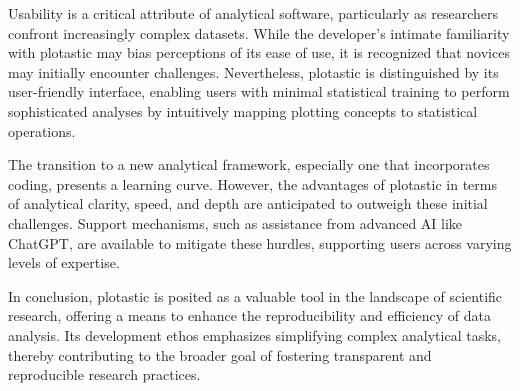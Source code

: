 Usability is a critical attribute of analytical software, particularly as
researchers confront increasingly complex datasets. While the developer's
intimate familiarity with plotastic may bias perceptions of its ease of use, it
is recognized that novices may initially encounter challenges. Nevertheless,
plotastic is distinguished by its user-friendly interface, enabling users with
minimal statistical training to perform sophisticated analyses by intuitively
mapping plotting concepts to statistical operations.

The transition to a new analytical framework, especially one that incorporates
coding, presents a learning curve. However, the advantages of plotastic in terms
of analytical clarity, speed, and depth are anticipated to outweigh these
initial challenges. Support mechanisms, such as assistance from advanced AI like
ChatGPT, are available to mitigate these hurdles, supporting users across
varying levels of expertise.

In conclusion, plotastic is posited as a valuable tool in the landscape of
scientific research, offering a means to enhance the reproducibility and
efficiency of data analysis. Its development ethos emphasizes simplifying
complex analytical tasks, thereby contributing to the broader goal of fostering
transparent and reproducible research practices.